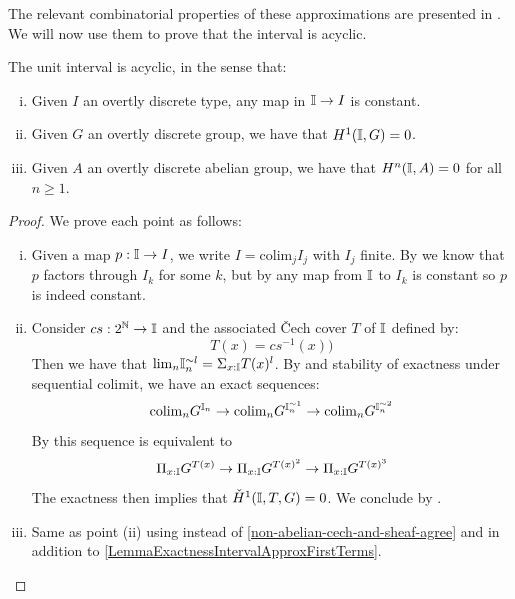 The relevant combinatorial properties of these approximations are presented in .
We will now use them to prove that the interval is acyclic. 

\begin{theorem}\label{cohomology-I}
The unit interval is acyclic, in the sense that:

\begin{enumerate}[(i)]
\item Given $I$ an overtly discrete type, any map in $\mathbb{I}\to I$ is constant.
\item Given $G$ an overtly discrete group, we have that $H^1(\mathbb{I},G) = 0$.
\item Given $A$ an overtly discrete abelian group, we have that $H^n(\mathbb{I},A) = 0$ for all $n\geq 1$.
\end{enumerate}
\end{theorem}

\begin{proof}
We prove each point as follows:

\begin{enumerate}[(i)]
\item Given a map $p:\mathbb{I}\to I$, we write $I=\mathrm{colim}_jI_j$ with $I_j$ finite. By  we know that $p$ factors through $I_k$ for some $k$, but by  any map from $\mathbb{I}$ to $I_k$ is constant so $p$ is indeed constant.
\item Consider $cs:2^{\mathbb{N}}\to\mathbb{I}$ and the associated \v{C}ech cover $T$ of $\mathbb{I}$ defined by: 
\[T(x) = cs^{-1}(x))\]
Then we have that $\mathrm{lim}_n\mathbb{I}_n^{\sim l} = \Sigma_{x:\mathbb{I}} T(x)^l$. 
By  and stability of exactness under sequential colimit, we have an exact sequences:
\[ \mathrm{colim}_n G^{\mathbb{I}_n} \to \mathrm{colim}_n G^{\mathbb{I}_n^{\sim1}}\to \mathrm{colim}_n G^{\mathbb{I}_n^{\sim2}}\]
By  this sequence is equivalent to
\[\Pi_{x:\mathbb{I}}G^{T(x)} \to  \Pi_{x:\mathbb{I}}G^{T(x)^2} \to  \Pi_{x:\mathbb{I}}G^{T(x)^3}\]
The exactness then implies that $\check{H}^1(\mathbb{I},T,G) = 0$.
We conclude by .
\item Same as point (ii) using  instead of \ref{non-abelian-cech-and-sheaf-agree} and  in addition to \ref{LemmaExactnessIntervalApproxFirstTerms}. 
\end{enumerate}

\end{proof}

